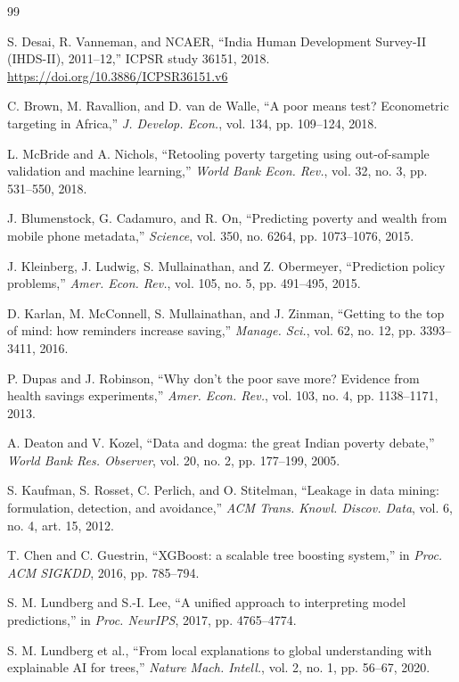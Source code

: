 \documentclass[conference]{IEEEtran}
\begin{document}
\begin{thebibliography}{99}

S. Desai, R. Vanneman, and NCAER, ``India Human Development Survey-II (IHDS-II), 2011--12,'' ICPSR study 36151, 2018. \url{https://doi.org/10.3886/ICPSR36151.v6}

C. Brown, M. Ravallion, and D. van de Walle, ``A poor means test? Econometric targeting in Africa,'' \emph{J. Develop. Econ.}, vol. 134, pp. 109--124, 2018.

L. McBride and A. Nichols, ``Retooling poverty targeting using out-of-sample validation and machine learning,'' \emph{World Bank Econ. Rev.}, vol. 32, no. 3, pp. 531--550, 2018.

J. Blumenstock, G. Cadamuro, and R. On, ``Predicting poverty and wealth from mobile phone metadata,'' \emph{Science}, vol. 350, no. 6264, pp. 1073--1076, 2015.

J. Kleinberg, J. Ludwig, S. Mullainathan, and Z. Obermeyer, ``Prediction policy problems,'' \emph{Amer. Econ. Rev.}, vol. 105, no. 5, pp. 491--495, 2015.

D. Karlan, M. McConnell, S. Mullainathan, and J. Zinman, ``Getting to the top of mind: how reminders increase saving,'' \emph{Manage. Sci.}, vol. 62, no. 12, pp. 3393--3411, 2016.

P. Dupas and J. Robinson, ``Why don't the poor save more? Evidence from health savings experiments,'' \emph{Amer. Econ. Rev.}, vol. 103, no. 4, pp. 1138--1171, 2013.

A. Deaton and V. Kozel, ``Data and dogma: the great Indian poverty debate,'' \emph{World Bank Res. Observer}, vol. 20, no. 2, pp. 177--199, 2005.

S. Kaufman, S. Rosset, C. Perlich, and O. Stitelman, ``Leakage in data mining: formulation, detection, and avoidance,'' \emph{ACM Trans. Knowl. Discov. Data}, vol. 6, no. 4, art. 15, 2012.

T. Chen and C. Guestrin, ``XGBoost: a scalable tree boosting system,'' in \emph{Proc. ACM SIGKDD}, 2016, pp. 785--794.

S. M. Lundberg and S.-I. Lee, ``A unified approach to interpreting model predictions,'' in \emph{Proc. NeurIPS}, 2017, pp. 4765--4774.

S. M. Lundberg et al., ``From local explanations to global understanding with explainable AI for trees,'' \emph{Nature Mach. Intell.}, vol. 2, no. 1, pp. 56--67, 2020.


\end{thebibliography}
\end{document}
